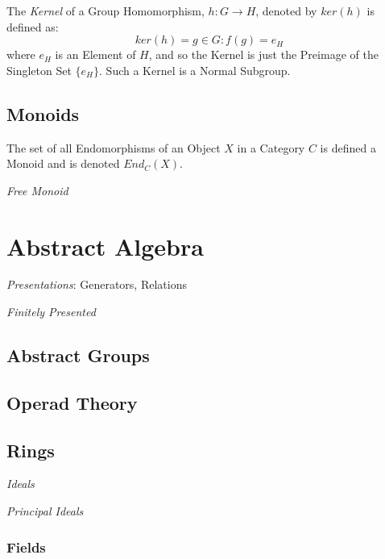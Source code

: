 The \emph{Kernel} of a Group Homomorphism, $h : G \rightarrow H$,
denoted by $ker(h)$ is defined as:
\[
    ker(h) = {g \in G : f(g) = e_H}
\]
where $e_H$ is an Element of $H$, and so the Kernel is just the
Preimage of the Singleton Set $\{e_H\}$. Such a Kernel is a Normal
Subgroup.

\subsection{Monoids}\label{subsec:monoids}

The set of all Endomorphisms of an Object $X$ in a Category $C$ is
defined a Monoid and is denoted $End_C(X)$.

\emph{Free Monoid}

\section{Abstract Algebra}\label{sec:abstract_algebra}
\emph{Presentations}: Generators, Relations

\emph{Finitely Presented}
\subsection{Abstract Groups}\label{subsec:abstract_groups}
\subsection{Operad Theory}\label{subsec:operad_theory}
\subsection{Rings}\label{subsec:rings}
\emph{Ideals}

\emph{Principal Ideals}

\subsubsection{Fields}

